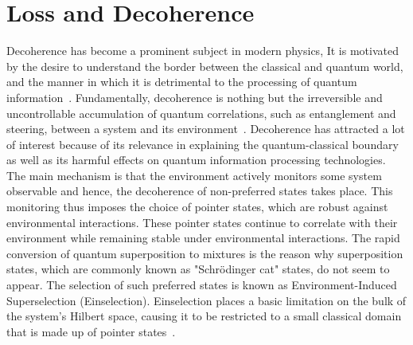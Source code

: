 \section{Loss and Decoherence}
Decoherence has become a prominent subject in modern physics, It is motivated by the desire to understand the border between the classical and quantum world, and the manner in which it is detrimental to the processing of quantum information~\cite{Alicki2004}. Fundamentally, decoherence is nothing but the irreversible and uncontrollable accumulation of quantum correlations, such as entanglement and steering, between a system and its environment~\cite{Alicki2004,Strunz2002}.
Decoherence has attracted a lot of interest because of its relevance in explaining the quantum-classical boundary as well as its harmful effects on quantum information processing technologies. The main mechanism is that the environment actively monitors some system observable and hence, the decoherence of non-preferred states takes place. This monitoring thus imposes the choice of pointer states, which are robust against environmental interactions\cite{Zurek2003,Alicki2004}.
These pointer states continue to correlate with their environment while remaining stable under environmental interactions. The rapid conversion of quantum superposition to mixtures is the reason why superposition states, which are commonly known as "Schr\"{o}dinger cat" states, do not seem to appear. The selection of such preferred states is known as Environment-Induced Superselection (Einselection). Einselection places a basic limitation on the bulk of the system's Hilbert space, causing it to be restricted to a small classical domain that is made up of pointer states~\cite{Zurek2003}.


